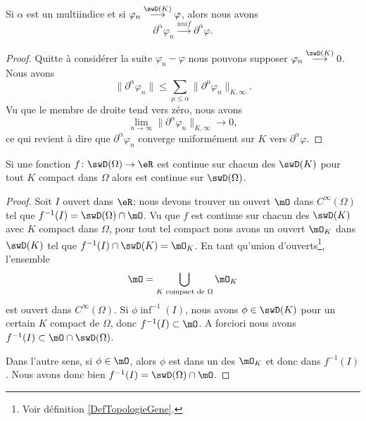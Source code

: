 \begin{lemma}    \label{LemXXwDjui}
    Si \( \alpha\) est un multiindice et si \( \varphi_n\stackrel{\swD(K)}{\longrightarrow}\varphi\), alors nous avons
    \begin{equation}
        \partial^{\alpha}\varphi_n\stackrel{unif}{\longrightarrow}\partial^{\alpha}\varphi.
    \end{equation}
\end{lemma}

\begin{proof}
    Quitte à considérer la suite \( \varphi_n-\varphi\) nous pouvons supposer \( \varphi_n\stackrel{\swD(K)}{\longrightarrow}0\). Nous avons
    \begin{equation}
        \| \partial^{\alpha}\varphi_n \|\leq \sum_{\mu\leq\alpha}\| \partial^{\mu}\varphi_n \|_{K,\infty}.
    \end{equation}
    Vu que le membre de droite tend vers zéro, nous avons 
    \begin{equation}
        \lim_{n\to \infty} \| \partial^{\alpha}\varphi_n \|_{K,\infty}\to 0,
    \end{equation}
    ce qui revient à dire que \( \partial^{\alpha}\varphi_n\) converge uniformément sur \( K\) vers \( \partial^{\alpha}\varphi\).
\end{proof}

\begin{lemma}   \label{LemWEGpemo}
    Si une fonction \( f\colon \swD(\Omega)\to \eR\) est continue sur chacun des \( \swD(K)\) pour tout \( K\) compact dans \( \Omega\) alors est continue sur \( \swD(\Omega)\).
\end{lemma}

\begin{proof}
    Soit \( I\) ouvert dans \( \eR\); nous devons trouver un ouvert \( \mO\) dans \(  C^{\infty}(\Omega)\) tel que \( f^{-1}(I)=\swD(\Omega)\cap\mO\). Vu que \( f\) est continue sur chacun des \( \swD(K)\) avec \( K\) compact dans \( \Omega\), pour tout tel compact nous avons un ouvert \( \mO_K\) dans \( \swD(K)\) tel que \( f^{-1}(I)\cap \swD(K)=\mO_K\). En tant qu'union d'ouverts\footnote{Voir définition \ref{DefTopologieGene}.}, l'ensemble
    \begin{equation}
        \mO=\bigcup_{\text{\( K\) compact de \( \Omega\)}}\mO_K
    \end{equation}
    est ouvert dans \(  C^{\infty}(\Omega)\). Si \( \phi\inf^{-1}(I)\), nous avons \( \phi\in\swD(K)\) pour un certain \( K\) compact de \( \Omega\), donc \( f^{-1}(I)\subset\mO\). A forciori nous avons \( f^{-1}(I)\subset\mO\cap\swD(\Omega)\).

    Dans l'autre sens, si \( \phi\in\mO\), alors \( \phi\) est dans un des \( \mO_K\) et donc dans \( f^{-1}(I)\). Nous avons donc bien \( f^{-1}(I)=\swD(\Omega)\cap \mO\).
\end{proof}

